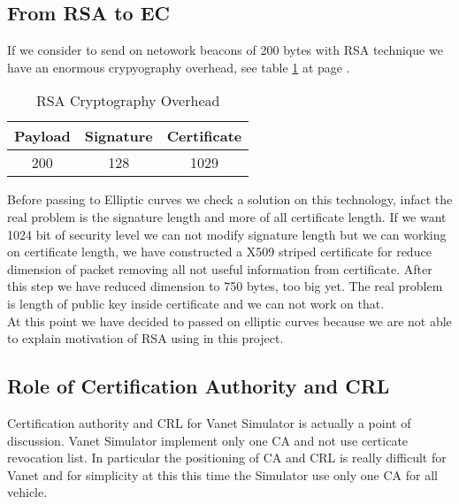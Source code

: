 \subsection{From RSA to EC}
If we consider to send on netowork beacons of 200 bytes with RSA technique we have an enormous crypyography overhead, see table \ref{tab:RSAOverHead} at page \pageref{tab:RSAOverHead}.
\begin{table}[!ht]
	\centering
	\caption{RSA Cryptography Overhead}
	\begin{tabular}{|c|c|c|}
	\hline\hline 
	\textbf{Payload} & \textbf{Signature} & \textbf{Certificate}\\
	\hline
	200 & 128 & 1029 \\
	\hline
	\hline     %
 	\end{tabular} 
	\label{tab:RSAOverHead}
\end{table}
Before passing to Elliptic curves we check a solution on this technology, infact the real problem is the signature length and more of all certificate length. If we want 1024 bit of security level we can not modify signature length but we can working on certificate length, we have constructed a X509 striped certificate for reduce dimension of packet removing all not useful information from certificate. After this step we have reduced dimension to 750 bytes, too big yet. The real problem is length of public key inside certificate and we can not work on that.\\
At this point we have decided to passed on elliptic curves because we are not able to explain motivation of RSA using in this project.
\subsection{Role of Certification Authority and CRL}
Certification authority and CRL for Vanet Simulator is actually a point of discussion\cite{calandriello}. Vanet Simulator implement only one CA and not use certicate revocation list. In particular the positioning of CA and CRL is really difficult for Vanet and for simplicity at this this time the Simulator use only one CA for all vehicle. 
